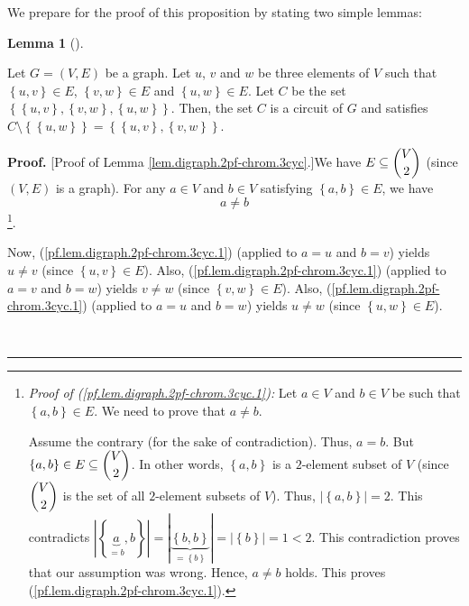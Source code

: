 \documentclass[numbers=enddot,12pt,final,onecolumn,notitlepage]{scrartcl}%
\theoremstyle{definition}
\newtheorem{lem}[theo]{Lemma}
\newenvironment{lemma}[1][]
{\begin{lem}[#1]\begin{leftbar}}
{\end{leftbar}\end{lem}}
\newenvironment{proof}[1][Proof]{\noindent\textbf{#1.} }{\ \rule{0.5em}{0.5em}}
\newenvironment{verlong}{}{}
\begin{document}
\begin{verlong}
We prepare for the proof of this proposition by stating two simple lemmas:

\begin{lemma}
\label{lem.digraph.2pf-chrom.3cyc}Let $G=\left(  V,E\right)  $ be a graph. Let
$u$, $v$ and $w$ be three elements of $V$ such that $\left\{  u,v\right\}  \in
E$, $\left\{  v,w\right\}  \in E$ and $\left\{  u,w\right\}  \in E$. Let $C$
be the set $\left\{  \left\{  u,v\right\}  ,\left\{  v,w\right\}  ,\left\{
u,w\right\}  \right\}  $. Then, the set $C$ is a circuit of $G$ and satisfies
$C\setminus\left\{  \left\{  u,w\right\}  \right\}  =\left\{  \left\{
u,v\right\}  ,\left\{  v,w\right\}  \right\}  $.
\end{lemma}

\begin{proof}
[Proof of Lemma \ref{lem.digraph.2pf-chrom.3cyc}.]We have $E\subseteq
\dbinom{V}{2}$ (since $\left(  V,E\right)  $ is a graph). For any $a\in V$ and
$b\in V$ satisfying $\left\{  a,b\right\}  \in E$, we have%
\begin{equation}
a\neq b \label{pf.lem.digraph.2pf-chrom.3cyc.1}%
\end{equation}
\footnote{\textit{Proof of (\ref{pf.lem.digraph.2pf-chrom.3cyc.1}):} Let $a\in
V$ and $b\in V$ be such that $\left\{  a,b\right\}  \in E$. We need to prove
that $a\neq b$.
\par
Assume the contrary (for the sake of contradiction). Thus, $a=b$. But
$\left\{  a,b\right\}  \in E\subseteq\dbinom{V}{2}$. In other words, $\left\{
a,b\right\}  $ is a $2$-element subset of $V$ (since $\dbinom{V}{2}$ is the
set of all $2$-element subsets of $V$). Thus, $\left\vert \left\{
a,b\right\}  \right\vert =2$. This contradicts $\left\vert \left\{
\underbrace{a}_{=b},b\right\}  \right\vert =\left\vert \underbrace{\left\{
b,b\right\}  }_{=\left\{  b\right\}  }\right\vert =\left\vert \left\{
b\right\}  \right\vert =1<2$. This contradiction proves that our assumption
was wrong. Hence, $a\neq b$ holds. This proves
(\ref{pf.lem.digraph.2pf-chrom.3cyc.1}).}.

Now, (\ref{pf.lem.digraph.2pf-chrom.3cyc.1}) (applied to $a=u$ and $b=v$)
yields $u\neq v$ (since $\left\{  u,v\right\}  \in E$). Also,
(\ref{pf.lem.digraph.2pf-chrom.3cyc.1}) (applied to $a=v$ and $b=w$) yields
$v\neq w$ (since $\left\{  v,w\right\}  \in E$). Also,
(\ref{pf.lem.digraph.2pf-chrom.3cyc.1}) (applied to $a=u$ and $b=w$) yields
$u\neq w$ (since $\left\{  u,w\right\}  \in E$).


\end{proof}
\end{verlong}
\end{document}
